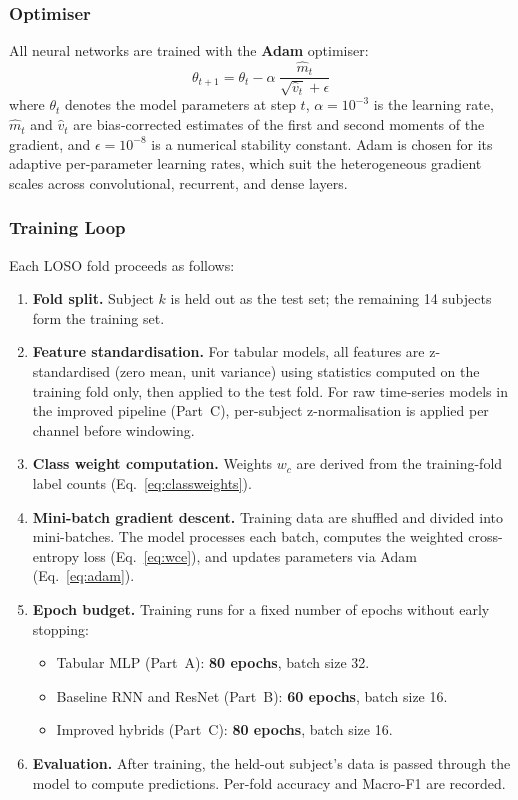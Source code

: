 \documentclass[11pt]{article}
\begin{document}
\subsubsection{Optimiser}
All neural networks are trained with the \textbf{Adam} optimiser:
\begin{equation}
\theta_{t+1} = \theta_t - \alpha \;\frac{\hat{m}_t}{\sqrt{\hat{v}_t} + \epsilon}
\label{eq:adam}
\end{equation}
where $\theta_t$ denotes the model parameters at step $t$, $\alpha = 10^{-3}$ is the learning rate, $\hat{m}_t$ and $\hat{v}_t$ are bias-corrected estimates of the first and second moments of the gradient, and $\epsilon = 10^{-8}$ is a numerical stability constant.
Adam is chosen for its adaptive per-parameter learning rates, which suit the heterogeneous gradient scales across convolutional, recurrent, and dense layers.

\subsubsection{Training Loop}
Each LOSO fold proceeds as follows:
\begin{enumerate}
    \item \textbf{Fold split.} Subject $k$ is held out as the test set; the remaining 14 subjects form the training set.
    \item \textbf{Feature standardisation.} For tabular models, all features are z-standardised (zero mean, unit variance) using statistics computed on the training fold only, then applied to the test fold. For raw time-series models in the improved pipeline (Part~C), per-subject z-normalisation is applied per channel before windowing.
    \item \textbf{Class weight computation.} Weights $w_c$ are derived from the training-fold label counts (Eq.~\ref{eq:classweights}).
    \item \textbf{Mini-batch gradient descent.} Training data are shuffled and divided into mini-batches. The model processes each batch, computes the weighted cross-entropy loss (Eq.~\ref{eq:wce}), and updates parameters via Adam (Eq.~\ref{eq:adam}).
    \item \textbf{Epoch budget.} Training runs for a fixed number of epochs without early stopping:
    \begin{itemize}
        \item Tabular MLP (Part~A): \textbf{80 epochs}, batch size 32.
        \item Baseline RNN and ResNet (Part~B): \textbf{60 epochs}, batch size 16.
        \item Improved hybrids (Part~C): \textbf{80 epochs}, batch size 16.
    \end{itemize}
    \item \textbf{Evaluation.} After training, the held-out subject's data is passed through the model to compute predictions. Per-fold accuracy and Macro-F1 are recorded.
\end{enumerate}
\end{document}
